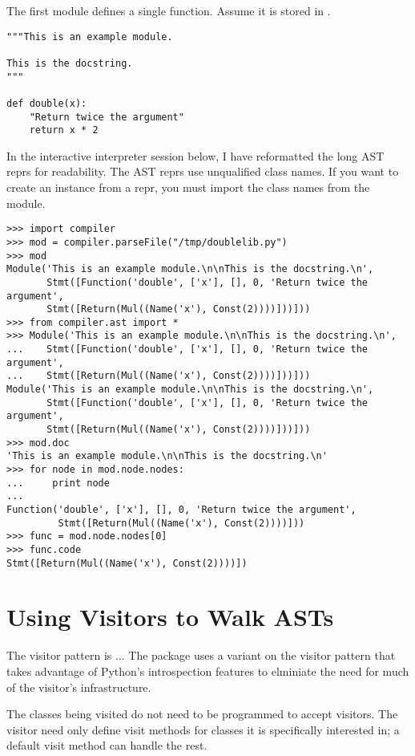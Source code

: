 \documentclass{howto}
\begin{document}
The first module defines a single function.  Assume it is stored in
. 

\begin{verbatim}
"""This is an example module.

This is the docstring.
"""

def double(x):
    "Return twice the argument"
    return x * 2
\end{verbatim}

In the interactive interpreter session below, I have reformatted the
long AST reprs for readability.  The AST reprs use unqualified class
names.  If you want to create an instance from a repr, you must import
the class names from the  module.

\begin{verbatim}
>>> import compiler
>>> mod = compiler.parseFile("/tmp/doublelib.py")
>>> mod
Module('This is an example module.\n\nThis is the docstring.\n', 
       Stmt([Function('double', ['x'], [], 0, 'Return twice the argument', 
       Stmt([Return(Mul((Name('x'), Const(2))))]))]))
>>> from compiler.ast import *
>>> Module('This is an example module.\n\nThis is the docstring.\n', 
...    Stmt([Function('double', ['x'], [], 0, 'Return twice the argument', 
...    Stmt([Return(Mul((Name('x'), Const(2))))]))]))
Module('This is an example module.\n\nThis is the docstring.\n', 
       Stmt([Function('double', ['x'], [], 0, 'Return twice the argument', 
       Stmt([Return(Mul((Name('x'), Const(2))))]))]))
>>> mod.doc
'This is an example module.\n\nThis is the docstring.\n'
>>> for node in mod.node.nodes:
...     print node
... 
Function('double', ['x'], [], 0, 'Return twice the argument',
         Stmt([Return(Mul((Name('x'), Const(2))))]))
>>> func = mod.node.nodes[0]
>>> func.code
Stmt([Return(Mul((Name('x'), Const(2))))])
\end{verbatim}

\section{Using Visitors to Walk ASTs}


The visitor pattern is ...  The  package uses a
variant on the visitor pattern that takes advantage of Python's
introspection features to elminiate the need for much of the visitor's
infrastructure.

The classes being visited do not need to be programmed to accept
visitors.  The visitor need only define visit methods for classes it
is specifically interested in; a default visit method can handle the
rest. 
\end{document}
